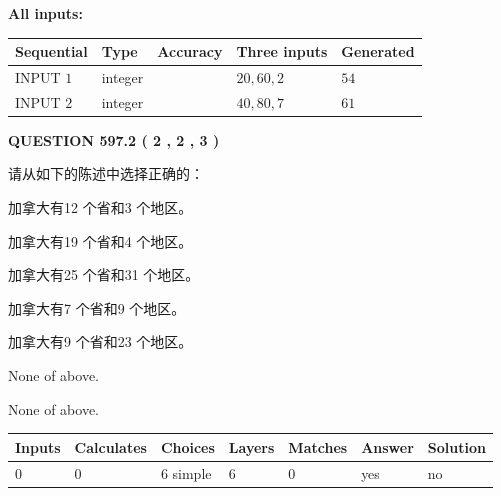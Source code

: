 \documentclass{ctexart}
\begin{document}
   
   
   
\noindent\vspace{0.1in}\hspace{-0.08in} {\textbf{\Large{All inputs: }}}
   
   
  
  
\noindent\begin{tabular}{|l|l|l|l|l|}
\hline
 Sequential & Type & Accuracy & Three inputs & Generated \\ 
\hline
 
 
  INPUT $  1 $ & integer &  & $
 20
 , 
 60
 , 
 2
 $ & $ 54 $ 
 \\  \hline  
 
 
  INPUT $  2 $ & integer &  & $
 40
 , 
 80
 , 
 7
 $ & $ 61 $ 
 \\  \hline  
 \end{tabular}
   
   
  
\vspace{0.2in}
  
{\textbf{\Large{QUESTION
597.2 
 ( 2 , 2 , 3 )
}}}
  
  
请从如下的陈述中选择正确的：
 
 
加拿大有12 个省和3 个地区。
 
 
加拿大有19 个省和4 个地区。
 
 
加拿大有25 个省和31 个地区。
 
 
加拿大有7 个省和9 个地区。
 
 
加拿大有9 个省和23 个地区。
 
 
 None of above.
 
 
\noindent{}
 
 
 None of above.
 
 
\noindent{}
 
 
   
   
   
   
\noindent\begin{tabular}{|l|l|l|l|l|l|l|}
 \hline
Inputs & Calculates & Choices & Layers & Matches & Answer & Solution \\ \hline
 0  & 
 0  & 
 6
  simple  
  & 
 6  & 
 0  & 
  yes & 
  no 
  \\ \hline
 \end{tabular}
   
\end{document}
